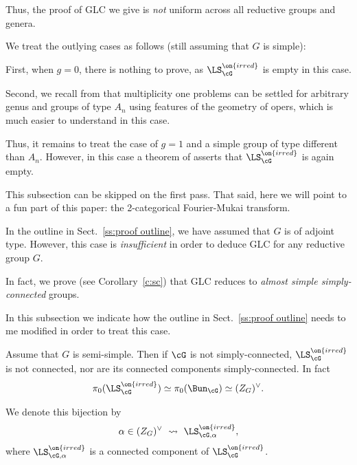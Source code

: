 \documentclass[9pt]{amsart}
\theoremstyle{remark}
\theoremstyle{definition}
\theoremstyle{remark}
\newcommand{\secref}[1]{Sect.~\ref{#1}}
\newcommand{\corref}[1]{Corollary~\ref{#1}}
\numberwithin{equation}{section}
\begin{document}
\medskip

Thus, the proof of GLC we give is \emph{not} uniform across all reductive groups and genera. 

\sssec{}

We treat the outlying cases as follows (still assuming that $G$ is simple): 

\medskip

First, when $g=0$, there is nothing to prove, as $\LS^{\on{irred}}_\cG$ is empty in this case.

\medskip

Second, we recall from \cite[Theorem 1.8.2]{GLC4} 
that multiplicity one problems can be settled for arbitrary
genus and groups of type $A_n$ using features of the 
geometry of opers, which is much easier to understand 
in this case.

\medskip

Thus, it remains to treat the case of $g=1$ and a simple group of type different than
$A_n$. However, in this case a theorem of \cite{KS,BFM} asserts that $\LS^{\on{irred}}_\cG$
is again empty. 


This subsection can be skipped on the first pass. That said, here we will point to a 
fun part of this paper: the 2-categorical Fourier-Mukai transform. 
 
\sssec{}

In the outline in \secref{ss:proof outline}, we have assumed that $G$ is of adjoint type. However, this case is \emph{insufficient}
in order to deduce GLC for any reductive group $G$. 

\medskip

In fact, we prove (see \corref{c:sc}) that GLC reduces
to \emph{almost simple simply-connected} groups.

\medskip

In this subsection we indicate how the outline in \secref{ss:proof outline} 
needs to me modified in order to treat this case. 





\sssec{}

Assume that $G$ is semi-simple. Then if $\cG$ is not simply-connected, 
$\LS^{\on{irred}}_\cG$ is not connected, nor are 
its connected components simply-connected.
In fact
$$\pi_0(\LS^{\on{irred}}_\cG)\simeq \pi_0(\Bun_\cG)\simeq (Z_G)^\vee.$$

We denote this bijection by
$$\alpha\in (Z_G)^\vee\,\, \rightsquigarrow \,\,\LS^{\on{irred}}_{\cG,\alpha},$$
where $\LS^{\on{irred}}_{\cG,\alpha}$ is a connected component of $\LS^{\on{irred}}_\cG$.
\end{document}
